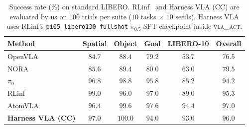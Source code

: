 \documentclass{article}
\begin{document}
\begin{table}[htbp]
\centering
\caption{Success rate (\%) on standard LIBERO. RLinf~\citep{yu2025rlinf} and Harness VLA (CC) are evaluated by us on $100$ trials per suite ($10$ tasks $\times$ $10$ seeds). Harness VLA uses RLinf's \texttt{pi05\_libero130\_fullshot} $\pi_{0.5}$-SFT checkpoint inside \textsc{vla\_act}.}
\label{tab:libero_main}
\small
\setlength{\tabcolsep}{5pt}
\begin{tabular}{lccccc}
\toprule
Method                                   & Spatial      & Object        & Goal         & LIBERO-10    & \textbf{Overall} \\
\midrule
OpenVLA~\citep{kim2024openvla}           & $84.7$       & $88.4$        & $79.2$       & $53.7$       & $76.5$ \\
NORA~\citep{hung2025nora}                & $85.6$       & $89.4$        & $80.0$       & $63.0$       & $79.5$ \\
$\pi_0$~\citep{black2025pi0}             & $96.8$       & $98.8$        & $95.8$       & $85.2$       & $94.2$ \\
RLinf                                    & $\mathbf{99.0}$ & $96.0$     & $97.0$       & $89.0$       & $95.3$ \\
AtomVLA~\citep{sun2026atomvla}           & $96.4$       & $99.6$        & $\mathbf{97.6}$ & $94.4$    & $\mathbf{97.0}$ \\
\textbf{Harness VLA (CC)}           & $97.0$       & $\mathbf{100.0}$ & $94.0$    & $93.0$       & $96.0$ \\
\bottomrule
\end{tabular}
\end{table}
\end{document}
